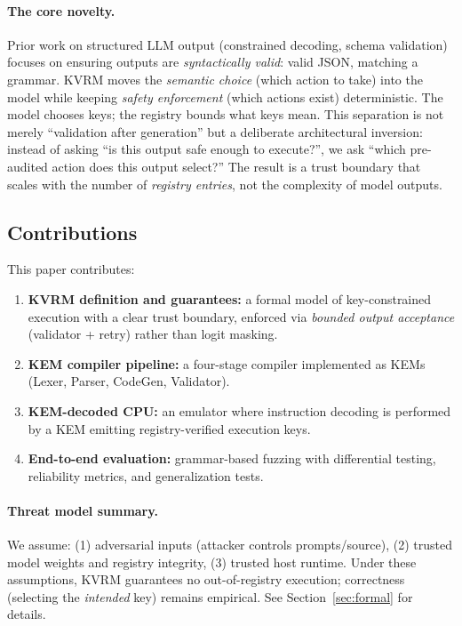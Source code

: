 \documentclass[11pt]{article}
\begin{document}
\paragraph{The core novelty.}
Prior work on structured LLM output (constrained decoding, schema validation) focuses on ensuring outputs are \emph{syntactically valid}: valid JSON, matching a grammar.
KVRM moves the \emph{semantic choice} (which action to take) into the model while keeping \emph{safety enforcement} (which actions exist) deterministic.
The model chooses keys; the registry bounds what keys mean.
This separation is not merely ``validation after generation'' but a deliberate architectural inversion: instead of asking ``is this output safe enough to execute?'', we ask ``which pre-audited action does this output select?''
The result is a trust boundary that scales with the number of \emph{registry entries}, not the complexity of model outputs.

\subsection{Contributions}
This paper contributes:
\begin{enumerate}[leftmargin=*]
  \item \textbf{KVRM definition and guarantees:} a formal model of key-constrained execution with a clear trust boundary, enforced via \emph{bounded output acceptance} (validator + retry) rather than logit masking.
  \item \textbf{KEM compiler pipeline:} a four-stage compiler implemented as KEMs (Lexer, Parser, CodeGen, Validator).
  \item \textbf{KEM-decoded CPU:} an emulator where instruction decoding is performed by a KEM emitting registry-verified execution keys.
  \item \textbf{End-to-end evaluation:} grammar-based fuzzing with differential testing, reliability metrics, and generalization tests.
\end{enumerate}

\paragraph{Threat model summary.}
We assume: (1) adversarial inputs (attacker controls prompts/source), (2) trusted model weights and registry integrity, (3) trusted host runtime. Under these assumptions, KVRM guarantees no out-of-registry execution; correctness (selecting the \emph{intended} key) remains empirical. See Section~\ref{sec:formal} for details.
\end{document}
